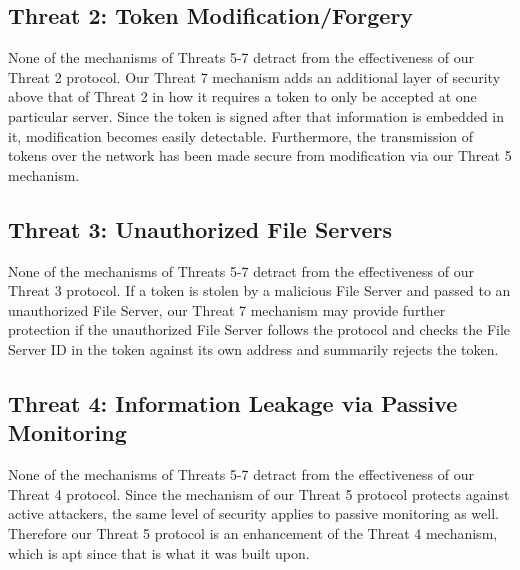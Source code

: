 \documentclass[11pt]{article}
\begin{document}
\subsection{Threat 2: Token Modification/Forgery}
None of the mechanisms of Threats 5-7 detract from the effectiveness of our Threat 2 protocol. Our Threat 7 mechanism adds an additional layer of security above that of Threat 2 in how it requires a token to only be accepted at one particular server. Since the token is signed after that information is embedded in it, modification becomes easily detectable. Furthermore, the transmission of tokens over the network has been made secure from modification via our Threat 5 mechanism.
\subsection{Threat 3: Unauthorized File Servers}
None of the mechanisms of Threats 5-7 detract from the effectiveness of our Threat 3 protocol. If a token is stolen by a malicious File Server and passed to an unauthorized File Server, our Threat 7 mechanism may provide further protection if the unauthorized File Server follows the protocol and checks the File Server ID in the token against its own address and summarily rejects the token.
\subsection{Threat 4: Information Leakage via Passive Monitoring}
None of the mechanisms of Threats 5-7 detract from the effectiveness of our Threat 4 protocol. Since the mechanism of our Threat 5 protocol protects against active attackers, the same level of security applies to passive monitoring as well. Therefore our Threat 5 protocol is an enhancement of the Threat 4 mechanism, which is apt since that is what it was built upon.
\end{document}
